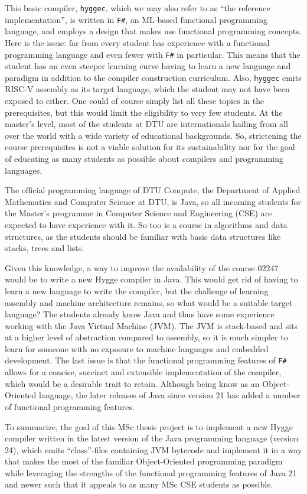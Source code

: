 This basic compiler, \texttt{hyggec}, which we may also refer to as ``the reference implementation'', is written in \texttt{F\#},
an ML-based functional programming language, and employs a design that makes use functional programming concepts.
Here is the issue: far from every student has experience with a functional programming language and even fewer with \texttt{F\#}
in particular. This means that the student has an even steeper learning curve having to learn a new language and paradigm
in addition to the compiler construction curriculum. Also, \texttt{hyggec} emits RISC-V assembly as its target language,
which the student may not have been exposed to either. One could of course simply list all these topics in the prerequisites,
but this would limit the eligibility to very few students. At the master's level, most of the students at DTU are internationals
hailing from all over the world with a wide variety of educational backgrounds. So, strictening the course prerequisites is not
a viable solution for its sustainability nor for the goal of educating as many students as possible about compilers and programming
languages.

The official programming language of DTU Compute, the Department of Applied Mathematics and Computer Science at DTU, is Java, so
all incoming students for the Master's programme in Computer Science and Engineering (CSE) are expected to have experience with it.
So too is a course in algorithms and data structures, as the students should be familiar with basic data structures like stacks, trees and lists.

Given this knowledge, a way to improve the availability of the course 02247 would be to write a new Hygge compiler in Java. This would
get rid of having to learn a new language to write the compiler, but the challenge of learning assembly and machine architecture remains,
so what would be a suitable target language? The students already know Java and thus have some experience working with the Java Virtual Machine (JVM).
The JVM is stack-based and sits at a higher level of abstraction compared to assembly, so it is much simpler to learn for someone with no exposure
to machine languages and embedded development. The last issue is that the functional programming features of \texttt{F\#} allows for a concise, 
succinct and extensible implementation of the compiler, which would be a desirable trait to retain. Although being know as an Object-Oriented
language, the later releases of Java since version 21 has added a number of functional programming features.

To summarize, the goal of this MSc thesis project is to implement a new Hygge compiler written in the latest version of the Java programming
language (version 24), which emits ``class''-files containing JVM bytecode and implement it in a way that makes the most of the familiar
Object-Oriented programming paradigm while leveraging the strengths of the functional programming features of Java 21 and newer such that
it appeals to as many MSc CSE students as possible.
